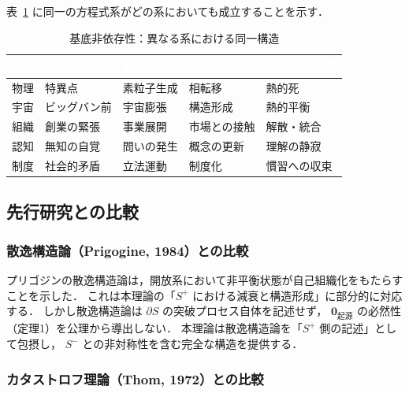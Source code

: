 \documentclass[12pt, a4paper]{article}
\theoremstyle{definition}
\newcommand{\vorigin}{\mathbf{0}_{\text{起源}}}
\newcommand{\vequil}{\mathbf{0}_{\text{平衡}}}
\begin{document}
表~\ref{tab:universality} に同一の方程式系がどの系においても成立することを示す．

\begin{table}[h!]
  \centering
  \caption{基底非依存性：異なる系における同一構造}
  \vspace{0.3em}
  \renewcommand{\arraystretch}{1.3}
  \begin{tabularx}{\textwidth}{lXXXX}
    \toprule
    \rowcolor{headerblue}
    \textcolor{white}{\textbf{系}} &
    \textcolor{white}{\textbf{$\vorigin$ の緊張}} &
    \textcolor{white}{\textbf{波の発生}} &
    \textcolor{white}{\textbf{$\partial S$ の突破}} &
    \textcolor{white}{\textbf{$\vequil$ への収束}} \\
    \midrule
    物理   & 特異点     & 素粒子生成   & 相転移       & 熱的死 \\
    宇宙   & ビッグバン前 & 宇宙膨張   & 構造形成     & 熱的平衡 \\
    組織   & 創業の緊張 & 事業展開     & 市場との接触 & 解散・統合 \\
    認知   & 無知の自覚 & 問いの発生   & 概念の更新   & 理解の静寂 \\
    制度   & 社会的矛盾 & 立法運動     & 制度化       & 慣習への収束 \\
    \bottomrule
  \end{tabularx}
  \label{tab:universality}
\end{table}

\subsection{先行研究との比較}

\subsubsection{散逸構造論（Prigogine, 1984）との比較}

プリゴジンの散逸構造論は，開放系において非平衡状態が自己組織化をもたらすことを示した．
これは本理論の「$S^+$ における減衰と構造形成」に部分的に対応する．
しかし散逸構造論は $\partial S$ の突破プロセス自体を記述せず，
$\vorigin$ の必然性（定理1）を公理から導出しない．
本理論は散逸構造論を「$S^+$ 側の記述」として包摂し，
$S^-$ との非対称性を含む完全な構造を提供する．

\subsubsection{カタストロフ理論（Thom, 1972）との比較}
\end{document}
